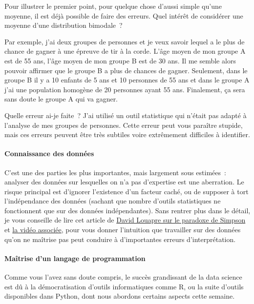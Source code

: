     Pour illustrer le premier point, pour quelque chose d'aussi simple
qu'une moyenne, il est déjà possible de faire des erreurs. Quel intérêt
de considérer une moyenne d'une distribution bimodale~?

Par exemple, j'ai deux groupes de personnes et je veux savoir lequel a
le plus de chance de gagner à une épreuve de tir à la corde. L'âge moyen
de mon groupe A est de 55 ans, l'âge moyen de mon groupe B est de 30
ans. Il me semble alors pouvoir affirmer que le groupe B a plus de
chances de gagner. Seulement, dans le groupe B il y a 10 enfants de 5
ans et 10 personnes de 55 ans et dans le groupe A j'ai une population
homogène de 20 personnes ayant 55 ans. Finalement, ça sera sans doute le
groupe A qui va gagner.

Quelle erreur ai-je faite~? J'ai utilisé un outil statistique qui
n'était pas adapté à l'analyse de mes groupes de personnes. Cette erreur
peut vous paraître stupide, mais ces erreurs peuvent être très subtiles
voire extrêmement difficiles à identifier.

    \hypertarget{connaissance-des-donnuxe9es}{%
\paragraph{Connaissance des données}\label{connaissance-des-donnuxe9es}}

    C'est une des parties les plus importantes, mais largement sous
estimées~: analyser des données sur lesquelles on n'a pas d'expertise
est une aberration. Le risque principal est d'ignorer l'existence d'un
facteur caché, ou de supposer à tort l'indépendance des données (sachant
que nombre d'outils statistiques ne fonctionnent que sur des données
indépendantes). Sans rentrer plus dans le détail, je vous conseille de
lire cet article de
\href{https://sciencetonnante.wordpress.com/2013/04/29/le-paradoxe-de-simpson/}{David
Louapre sur le paradoxe de Simpson} et
\href{https://www.youtube.com/watch?v=vs_Zzf_vL2I}{la vidéo associée},
pour vous donner l'intuition que travailler sur des données qu'on ne
maîtrise pas peut conduire à d'importantes erreurs d'interprétation.

    \hypertarget{mauxeetrise-dun-langage-de-programmation}{%
\paragraph{Maîtrise d'un langage de
programmation}\label{mauxeetrise-dun-langage-de-programmation}}

    Comme vous l'avez sans doute compris, le succès grandissant de la data
science est dû à la démocratisation d'outils informatiques comme R, ou
la suite d'outils disponibles dans Python, dont nous abordons certains
aspects cette semaine.


